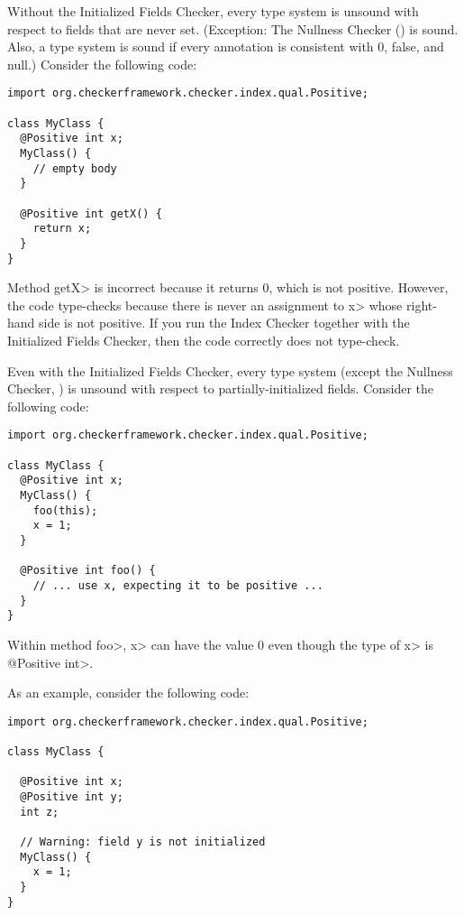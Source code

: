 
Without the Initialized Fields Checker, every type system is
unsound with respect to fields that are never set.  (Exception:  The
Nullness Checker () is sound. Also, a type
system is sound if every annotation is consistent with 0, false, and null.)
Consider the following code:

\begin{Verbatim}
import org.checkerframework.checker.index.qual.Positive;

class MyClass {
  @Positive int x;
  MyClass() {
    // empty body
  }

  @Positive int getX() {
    return x;
  }
}
\end{Verbatim}

\noindent
Method \<getX> is incorrect because it returns 0, which is not positive.
However, the code type-checks because there is never an assignment to \<x>
whose right-hand side is not positive.
If you run the Index Checker together with the Initialized Fields Checker,
then the code correctly does not type-check.



Even with the Initialized Fields Checker, every type system (except the
Nullness Checker, ) is unsound with
respect to partially-initialized fields.  Consider the following code:

\begin{Verbatim}
import org.checkerframework.checker.index.qual.Positive;

class MyClass {
  @Positive int x;
  MyClass() {
    foo(this);
    x = 1;
  }

  @Positive int foo() {
    // ... use x, expecting it to be positive ...
  }
}
\end{Verbatim}

\noindent
Within method \<foo>, \<x> can have the value 0 even though the type of
\<x> is \<@Positive int>.



As an example, consider the following code:

\begin{Verbatim}
import org.checkerframework.checker.index.qual.Positive;

class MyClass {

  @Positive int x;
  @Positive int y;
  int z;

  // Warning: field y is not initialized
  MyClass() {
    x = 1;
  }
}
\end{Verbatim}

